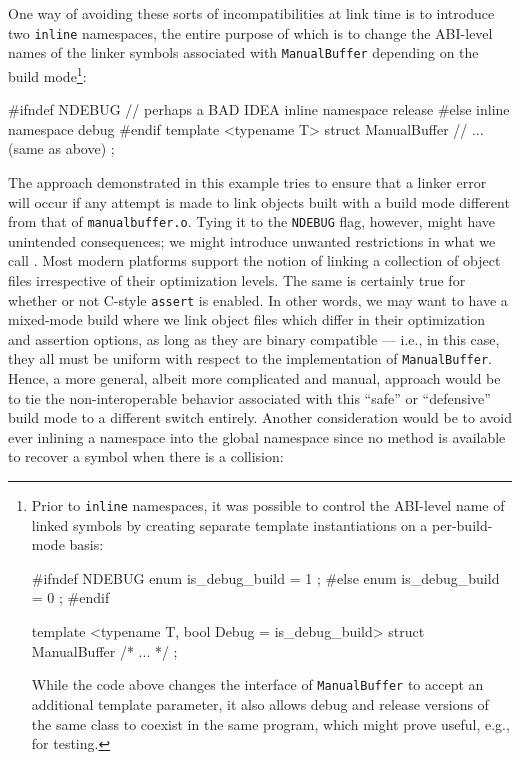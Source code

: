 One way of avoiding these sorts of incompatibilities at link time is to
introduce two \lstinline!inline! namespaces, the entire purpose of which is
to change the ABI-level names of the linker symbols associated with
\lstinline!ManualBuffer! depending on the build mode{\cprotect\footnote{Prior
to \lstinline!inline! namespaces, it was possible to control the
ABI-level name of linked symbols by creating separate template
instantiations on a per-build-mode basis:

\begin{emcppslisting}[language=C++, style=footcode]
#ifndef NDEBUG
enum { is_debug_build = 1 };
#else
enum { is_debug_build = 0 };
#endif

template <typename T, bool Debug = is_debug_build>
struct ManualBuffer { /* ... */ };
\end{emcppslisting}
    
\noindent While the code above changes the interface of \lstinline!ManualBuffer! to
accept an additional template parameter, it also allows debug and
release versions of the same class to coexist in the same program,
  which might prove useful, e.g., for testing.}}:

\begin{emcppslisting}
#ifndef NDEBUG            // perhaps a BAD IDEA
inline namespace release
#else
inline namespace debug
#endif
{
    template <typename T>
    struct ManualBuffer
    {
        // ... (same as above)
    };
}
\end{emcppslisting}
    
\noindent The approach demonstrated in this example tries to ensure that a linker
error will occur if any attempt is made to link objects built with a
build mode different from that of \mbox{\lstinline!manualbuffer.o!}. Tying it to
the \lstinline!NDEBUG! flag, however, might have unintended consequences;
we might introduce unwanted restrictions in what we call
. Most modern platforms support the notion of
linking a collection of object files irrespective of their
optimization levels. The same is certainly true for whether or not
C-style \lstinline!assert! is enabled. In other words, we may want to have
a mixed-mode build where we link object files which differ in their optimization and assertion options, as long as they are binary compatible --- i.e., in this case, they all must be uniform with respect to the implementation of \lstinline!ManualBuffer!.  Hence, a more general, albeit more complicated and
manual, approach would be to tie the non-interoperable behavior
associated with this ``safe'' or ``defensive'' build mode to a different
switch entirely. Another consideration would be to avoid ever inlining a
namespace into the global namespace since no method is available to
recover a symbol when there is a collision:

